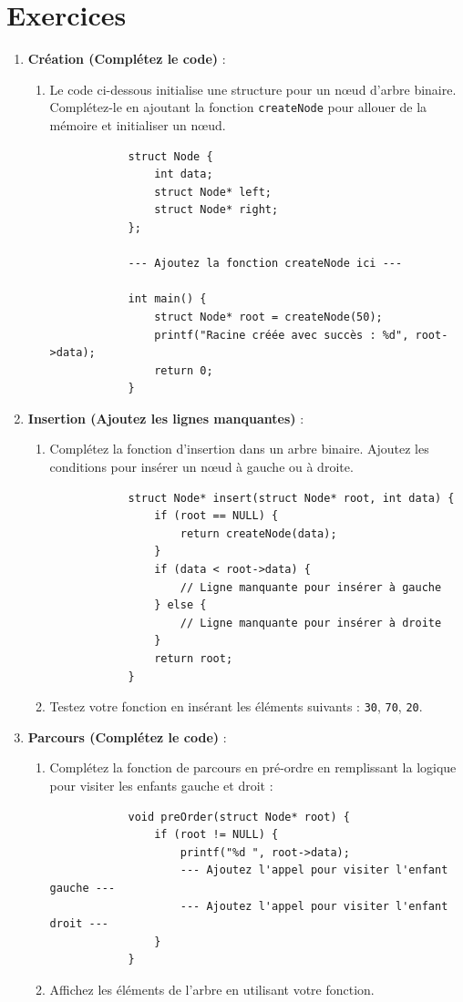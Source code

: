 \section*{Exercices}
\begin{enumerate}
	\item \textbf{Création (Complétez le code)} :
	\begin{enumerate}
		\item Le code ci-dessous initialise une structure pour un nœud d'arbre binaire. Complétez-le en ajoutant la fonction \texttt{createNode} pour allouer de la mémoire et initialiser un nœud.
		\begin{verbatim}
			struct Node {
				int data;
				struct Node* left;
				struct Node* right;
			};
			
			--- Ajoutez la fonction createNode ici ---
			
			int main() {
				struct Node* root = createNode(50);
				printf("Racine créée avec succès : %d", root->data);
				return 0;
			}
		\end{verbatim}
	\end{enumerate}
	
	\item \textbf{Insertion (Ajoutez les lignes manquantes)} :
	\begin{enumerate}
		\item Complétez la fonction d'insertion dans un arbre binaire. Ajoutez les conditions pour insérer un nœud à gauche ou à droite.
		\begin{verbatim}
			struct Node* insert(struct Node* root, int data) {
				if (root == NULL) {
					return createNode(data);
				}
				if (data < root->data) {
					// Ligne manquante pour insérer à gauche
				} else {
					// Ligne manquante pour insérer à droite
				}
				return root;
			}
		\end{verbatim}
		\item Testez votre fonction en insérant les éléments suivants : \texttt{30}, \texttt{70}, \texttt{20}.
	\end{enumerate}
	
	\item \textbf{Parcours (Complétez le code)} :
	\begin{enumerate}
		\item Complétez la fonction de parcours en pré-ordre en remplissant la logique pour visiter les enfants gauche et droit :
		\begin{verbatim}
			void preOrder(struct Node* root) {
				if (root != NULL) {
					printf("%d ", root->data);
					--- Ajoutez l'appel pour visiter l'enfant gauche ---
					--- Ajoutez l'appel pour visiter l'enfant droit ---
				}
			}
		\end{verbatim}
		\item Affichez les éléments de l’arbre en utilisant votre fonction.
	\end{enumerate}
	

\end{enumerate}
